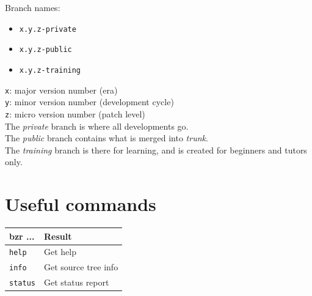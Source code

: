 \documentclass[tumble,foldmark,a4paper]{leaflet}
\begin{document}
Branch names:
\begin{center}
\begin{itemize}
 \item \texttt{x.y.z-private}
 \item \texttt{x.y.z-public}
 \item \texttt{x.y.z-training}
\end{itemize}
\end{center}

\texttt{x}: major version number (era)\\
\texttt{y}: minor version number (development cycle) \\
\texttt{z}: micro version number (patch level) \\

The \textit{private} branch is where all developments go. \\
The \textit{public} branch contains what is merged into \textit{trunk}. \\
The \textit{training} branch is there for learning, and is created for
beginners and tutors only. \\

\vspace{1em}

\begin{center}
\colorbox{infobg}{}
\end{center}

\newpage

\section*{Useful commands}

\begin{center}
 \begin{tabular}{l l}
  \textbf{bzr ...} & \textbf{Result} \\
  \hline
  \texttt{help} & Get help \\
  \texttt{info} & Get source tree info \\
  \texttt{status} & Get status report \\
 \end{tabular}
\end{center}
\end{document}
